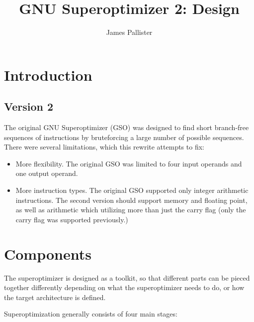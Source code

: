 \documentclass{article}
\begin{document}
\title{GNU Superoptimizer 2: Design}
\author{James Pallister}

\maketitle

\section{Introduction}


\subsection{Version 2}

The original GNU Superoptimizer (GSO) was designed to find short branch-free sequences of instructions by bruteforcing a large number of possible sequences. There were several limitations, which this rewrite attempts to fix:

\begin{itemize}
    \item More flexibility. The original GSO was limited to four input operands and one output operand.
    \item More instruction types. The original GSO supported only integer arithmetic instructions. The second version should support memory and floating point, as well as arithmetic which utilizing more than just the carry flag (only the carry flag was supported previously.)
\end{itemize}




\section{Components}

The superoptimizer is designed as a toolkit, so that different parts can be pieced together differently depending on what the superoptimizer needs to do, or how the target architecture is defined.

Superoptimization generally consists of four main stages:
\end{document}
